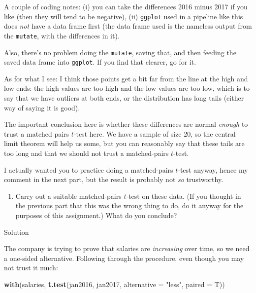 \documentclass[]{tufte-book}
\newenvironment{Shaded}{}{}
\newcommand{\DataTypeTok}[1]{\textcolor[rgb]{0.56,0.13,0.00}{#1}}
\newcommand{\KeywordTok}[1]{\textcolor[rgb]{0.00,0.44,0.13}{\textbf{#1}}}
\newcommand{\NormalTok}[1]{#1}
\newcommand{\StringTok}[1]{\textcolor[rgb]{0.25,0.44,0.63}{#1}}
\providecommand{\tightlist}{%
  \setlength{\itemsep}{0pt}\setlength{\parskip}{0pt}}
\theoremstyle{definition}
\theoremstyle{definition}
\theoremstyle{definition}
\theoremstyle{remark}
\begin{document}
A couple of coding notes: (i) you can take the differences 2016 minus
2017 if you like (then they will tend to be negative), (ii)
\texttt{ggplot} used in a pipeline like this does \emph{not} have a data
frame first (the data frame used is the nameless output from the
\texttt{mutate}, with the differences in it).

Also, there's no problem doing the \texttt{mutate}, saving that, and
then feeding the saved data frame into \texttt{ggplot}. If you find that
clearer, go for it.

As for what I see: I think those points get a bit far from the line at
the high and low ends: the high values are too high and the low values
are too low, which is to say that we have outliers at both ends, or the
distribution has long tails (either way of saying it is good).

The important conclusion here is whether these differences are normal
\emph{enough} to trust a matched pairs \(t\)-test here. We have a sample
of size 20, so the central limit theorem will help us some, but you can
reasonably say that these tails are too long and that we should not
trust a matched-pairs \(t\)-test.

I actually wanted you to practice doing a matched-pairs \(t\)-test
anyway, hence my comment in the next part, but the result is probably
not \emph{so} trustworthy.

\begin{enumerate}
\def\labelenumi{(\alph{enumi})}
\setcounter{enumi}{3}
\tightlist
\item
  Carry out a suitable matched-pairs \(t\)-test on these data. (If you
  thought in the previous part that this was the wrong thing to do, do
  it anyway for the purposes of this assignment.) What do you conclude?
\end{enumerate}

Solution

The company is trying to prove that salaries are \emph{increasing} over
time, so we need a one-sided alternative. Following through the
procedure, even though you may not trust it much:

\begin{Shaded}
\begin{Highlighting}[]
\KeywordTok{with}\NormalTok{(salaries, }\KeywordTok{t.test}\NormalTok{(jan2016, jan2017, }\DataTypeTok{alternative =} \StringTok{"less"}\NormalTok{, }
    \DataTypeTok{paired =}\NormalTok{ T))}
\end{Highlighting}
\end{Shaded}
\end{document}
